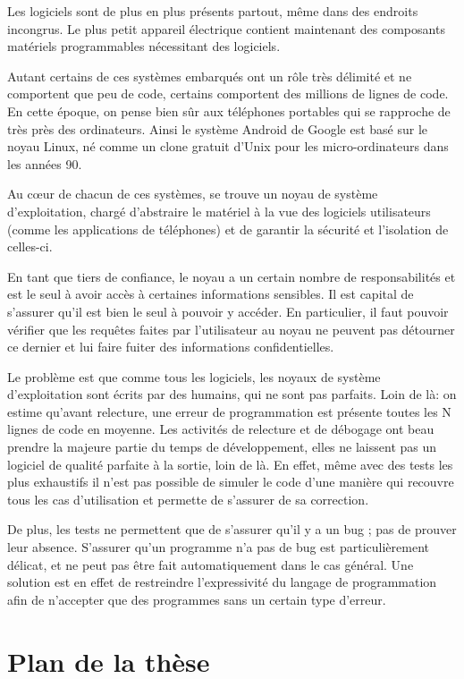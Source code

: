 Les logiciels sont de plus en plus présents partout, même dans des endroits
incongrus. Le plus petit appareil électrique contient maintenant des composants
matériels programmables nécessitant des logiciels.

Autant certains de ces systèmes embarqués ont un rôle très délimité et ne
comportent que peu de code, certains comportent des millions de lignes de code.
En cette époque, on pense bien sûr aux téléphones portables qui se rapproche
de très près des ordinateurs. Ainsi le système Android de Google est basé sur le
noyau Linux, né comme un clone gratuit d'Unix pour les micro-ordinateurs dans
les années 90.

Au cœur de chacun de ces systèmes, se trouve un noyau de système d'exploitation,
chargé d'abstraire le matériel à la vue des logiciels utilisateurs (comme les
applications de téléphones) et de garantir la sécurité et l'isolation de
celles-ci.

En tant que tiers de confiance, le noyau a un certain nombre de responsabilités
et est le seul à avoir accès à certaines informations sensibles. Il est capital
de s'assurer qu'il est bien le seul à pouvoir y accéder. En particulier, il faut
pouvoir vérifier que les requêtes faites par l'utilisateur au noyau ne peuvent
pas détourner ce dernier et lui faire fuiter des informations confidentielles.


Le problème est que comme tous les logiciels, les noyaux de système
d'exploitation sont écrits par des humains, qui ne sont pas parfaits. Loin de
là: on estime qu'avant relecture, une erreur de programmation est présente
toutes les N lignes de code en moyenne. Les activités de relecture et de
débogage ont beau prendre la majeure partie du temps de développement, elles ne
laissent pas un logiciel de qualité parfaite à la sortie, loin de là. En effet,
même avec des tests les plus exhaustifs il n'est pas possible de simuler le code
d'une manière qui recouvre tous les cas d'utilisation et permette de s'assurer
de sa correction.

De plus, les tests ne permettent que de s'assurer qu'il y a un bug ; pas de
prouver leur absence. S'assurer qu'un programme n'a pas de bug est
particulièrement délicat, et ne peut pas être fait automatiquement dans le cas
général. Une solution est en effet de restreindre l'expressivité du langage de
programmation afin de n'accepter que des programmes sans un certain type
d'erreur.

\section{Plan de la thèse}

